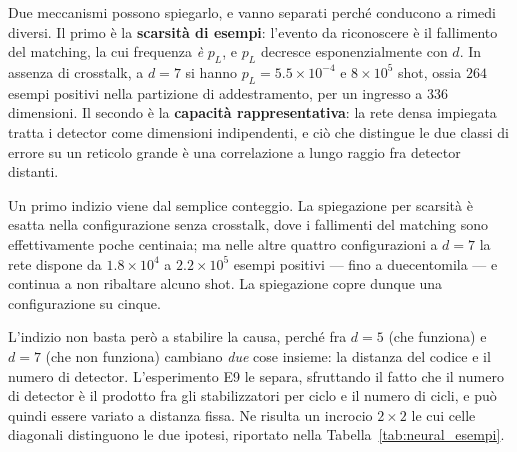 Due meccanismi possono spiegarlo, e vanno separati perché conducono a rimedi diversi. Il primo è la \textbf{scarsità di esempi}: l'evento da riconoscere è il fallimento del matching, la cui frequenza \emph{è} $p_L$, e $p_L$ decresce esponenzialmente con $d$. In assenza di crosstalk, a $d=7$ si hanno $p_L = 5.5\times10^{-4}$ e $8\times10^5$ shot, ossia $264$ esempi positivi nella partizione di addestramento, per un ingresso a $336$ dimensioni. Il secondo è la \textbf{capacità rappresentativa}: la rete densa impiegata tratta i detector come dimensioni indipendenti, e ciò che distingue le due classi di errore su un reticolo grande è una correlazione a lungo raggio fra detector distanti.

Un primo indizio viene dal semplice conteggio. La spiegazione per scarsità è esatta nella configurazione senza crosstalk, dove i fallimenti del matching sono effettivamente poche centinaia; ma nelle altre quattro configurazioni a $d=7$ la rete dispone da $1.8\times10^4$ a $2.2\times10^5$ esempi positivi --- fino a duecentomila --- e continua a non ribaltare alcuno shot. La spiegazione copre dunque una configurazione su cinque.

L'indizio non basta però a stabilire la causa, perché fra $d=5$ (che funziona) e $d=7$ (che non funziona) cambiano \emph{due} cose insieme: la distanza del codice e il numero di detector. L'esperimento E9 le separa, sfruttando il fatto che il numero di detector è il prodotto fra gli stabilizzatori per ciclo e il numero di cicli, e può quindi essere variato a distanza fissa. Ne risulta un incrocio $2\times2$ le cui celle diagonali distinguono le due ipotesi, riportato nella Tabella~\ref{tab:neural_esempi}.

